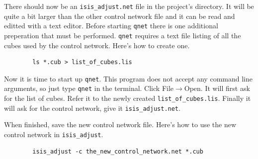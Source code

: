 There should now be an \verb=isis_adjust.net= file in the project's
directory. It will be quite a bit larger than the other control
network file and it can be read and editted with a text editor. Before
starting \texttt{qnet} there is one additional preperation that must
be performed. \texttt{qnet} requires a text file listing of all the
cubes used by the control network. Here's how to create one.

\begin{verbatim}
        ls *.cub > list_of_cubes.lis
\end{verbatim}

Now it is time to start up \texttt{qnet}. This program does not accept
any command line arguments, so just type \texttt{qnet} in the
terminal. Click File$\rightarrow$Open. It will first ask for the list
of cubes. Refer it to the newly created
\verb=list_of_cubes.lis=. Finally it will ask for the control network,
give it \verb=isis_adjust.net=.

\begin{center}
\end{center}

When finished, save the new control network file. Here's how to use
the new control network in \texttt{isis\_adjust}.

\begin{verbatim}
        isis_adjust -c the_new_control_network.net *.cub
\end{verbatim}

% 
% 
